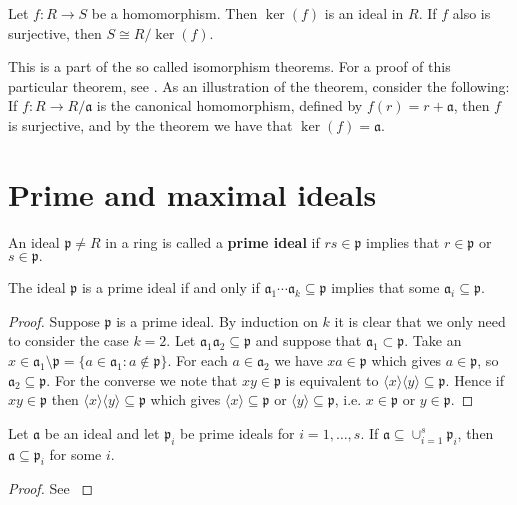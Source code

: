 \documentclass[english,bachelor]{liumaiex}
\begin{document}
\begin{thm}
Let $f\colon R\to S$ be a homomorphism. Then $\ker(f)$ is an ideal in $R$. If $f$ also is surjective, then $S\cong R/\ker(f).$
\end{thm}
This is a part of the so called isomorphism theorems. For a proof of this particular theorem, see \cite[p. 26]{froberg}. As an illustration of the theorem, consider the following: If $f\colon R\to R/\mathfrak{a}$ is the canonical homomorphism, defined by $f(r) = r + \mathfrak{a}$, then $f$ is surjective, and by the theorem we have that $\ker(f)=\mathfrak{a}$.

\section{Prime and maximal ideals}

\begin{define}
An ideal $\mathfrak{p}\neq R$ in a ring is called a \textbf{prime ideal} if $rs\in \mathfrak{p}$ implies that $r\in \mathfrak{p}$ or $s\in \mathfrak{p}.$
\end{define}
\begin{lem}
The ideal $\mathfrak{p}$ is a prime ideal if and only if $\mathfrak{a}_1\cdots\mathfrak{a}_k\subseteq\mathfrak{p}$ implies that some $\mathfrak{a}_i\subseteq\mathfrak{p}.$
\end{lem}
\begin{proof}
Suppose $\mathfrak{p}$ is a prime ideal. By induction on $k$ it is clear that we only need to consider the case $k=2$. Let $\mathfrak{a}_1\mathfrak{a}_2\subseteq\mathfrak{p}$ and suppose that $\mathfrak{a}_1\subset\mathfrak{p}.$ Take an $x\in\mathfrak{a}_1\setminus \mathfrak{p} = \{a\in\mathfrak{a}_1 : a\notin\mathfrak{p}\}.$ For each $a\in\mathfrak{a}_2$ we have $xa\in\mathfrak{p}$ which gives $a\in\mathfrak{p}$, so $\mathfrak{a}_2\subseteq\mathfrak{p}.$ \newline 
For the converse we note that $xy\in\mathfrak{p}$ is equivalent to $\langle x \rangle \langle y \rangle \subseteq \mathfrak{p}.$ Hence if $xy\in\mathfrak{p}$ then $\langle x \rangle \langle y \rangle \subseteq \mathfrak{p}$ which gives $\langle x \rangle \subseteq\mathfrak{p}$ or $\langle y \rangle \subseteq \mathfrak{p}$, i.e. $x\in\mathfrak{p}$ or $y\in\mathfrak{p}.$
\end{proof}

\begin{lem}
Let $\mathfrak{a}$ be an ideal and let $\mathfrak{p}_i$ be prime ideals for $i=1,\dots,s.$ If $\mathfrak{a}\subseteq\cup_{i=1}^s \mathfrak{p}_i$, then $\mathfrak{a}\subseteq\mathfrak{p}_i$ for some $i$.
\end{lem}
\begin{proof}
See \cite[p. 29]{froberg}
\end{proof}
\end{document}
